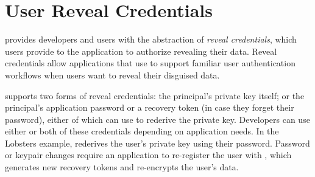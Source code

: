 
\section{User Reveal Credentials}
\sys provides developers and users
with the abstraction of \emph{reveal credentials}, which users provide to the
application to authorize revealing their data.
%
Reveal credentials allow applications that use \sys to support familiar user authentication workflows
when users want to reveal their disguised data. 
%

%
\sys supports two forms of reveal credentials: \one{} the principal's private key
itself; or \two{} the principal's application password or a recovery
token (in case they forget their password), either of which \sys can use to rederive
the private key.
%
Developers can use either or both of these credentials depending on application needs.
%
In the Lobsters example, \sys rederives the user's private key using their password.
%
%
%
Password or keypair changes require an application to re-register the user with
\sys, which generates new recovery tokens and re-encrypts the user's \xxed data.
%
%
%
%

%
%

